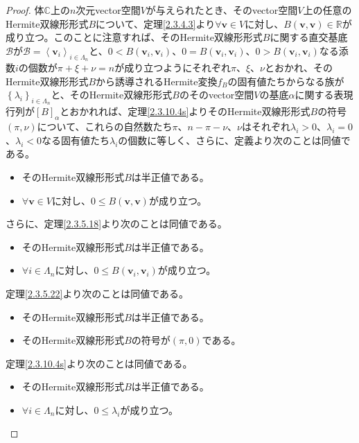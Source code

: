 \documentclass[dvipdfmx]{jsarticle}
\begin{document}
\begin{proof}
体$\mathbb{C}$上の$n$次元vector空間$V$が与えられたとき、そのvector空間$V$上の任意のHermite双線形形式$B$について、定理\ref{2.3.4.3}より$\forall\mathbf{v} \in V$に対し、$B\left( \mathbf{v},\mathbf{v} \right) \in \mathbb{R}$が成り立つ。このことに注意すれば、そのHermite双線形形式$B$に関する直交基底$\mathcal{B}$が$\mathcal{B} =\left\langle \mathbf{v}_{i} \right\rangle_{i \in \varLambda_{n}}$と、$0 < B\left( \mathbf{v}_{i},\mathbf{v}_{i} \right)$、$0 = B\left( \mathbf{v}_{i},\mathbf{v}_{i} \right)$、$0 > B\left( \mathbf{v}_{i},\mathbf{v}_{i} \right)$なる添数$i$の個数が$\pi + \xi + \nu = n$が成り立つようにそれぞれ$\pi$、$\xi$、$\nu$とおかれ、そのHermite双線形形式$B$から誘導されるHermite変換$f_{B}$の固有値たちからなる族が$\left\{ \lambda_{i} \right\}_{i \in \varLambda_{n}}$と、そのHermite双線形形式$B$のそのvector空間$V$の基底$\alpha$に関する表現行列が$[ B]_{\alpha}$とおかれれば、定理\ref{2.3.10.4s}よりそのHermite双線形形式$B$の符号$(\pi,\nu)$について、これらの自然数たち$\pi$、$n - \pi - \nu$、$\nu$はそれぞれ$\lambda_{i} > 0$、$\lambda_{i} = 0$、$\lambda_{i} < 0$なる固有値たち$\lambda_{i}$の個数に等しく、さらに、定義より次のことは同値である。
\begin{itemize}
\item
  そのHermite双線形形式$B$は半正値である。
\item
  $\forall\mathbf{v} \in V$に対し、$0 \leq B\left( \mathbf{v},\mathbf{v} \right)$が成り立つ。
\end{itemize}
さらに、定理\ref{2.3.5.18}より次のことは同値である。
\begin{itemize}
\item
  そのHermite双線形形式$B$は半正値である。
\item
  $\forall i \in \varLambda_{n}$に対し、$0 \leq B\left( \mathbf{v}_{i},\mathbf{v}_{i} \right)$が成り立つ。
\end{itemize}
定理\ref{2.3.5.22}より次のことは同値である。
\begin{itemize}
\item
  そのHermite双線形形式$B$は半正値である。
\item
  そのHermite双線形形式$B$の符号が$(\pi,0)$である。
\end{itemize}
定理\ref{2.3.10.4s}より次のことは同値である。
\begin{itemize}
\item
  そのHermite双線形形式$B$は半正値である。
\item
  $\forall i \in \varLambda_{n}$に対し、$0 \leq \lambda_{i}$が成り立つ。

\end{itemize}
\end{proof}
\end{document}
